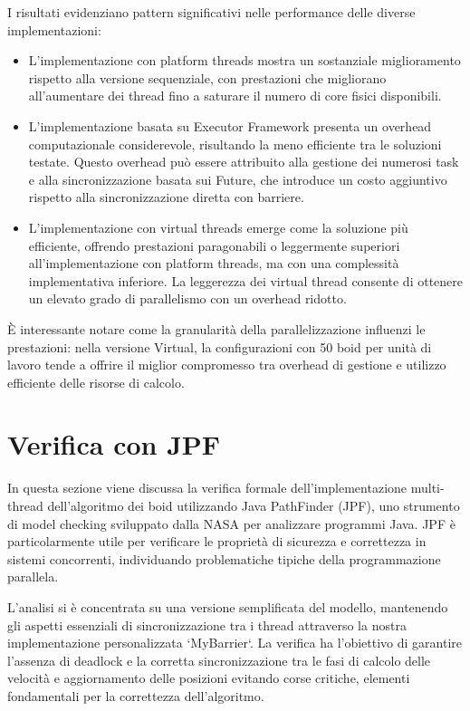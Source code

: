 \documentclass[a4paper,12pt]{report}
\begin{document}
I risultati evidenziano pattern significativi nelle performance delle diverse implementazioni:

\begin{itemize}
    \item L'implementazione con platform threads mostra un sostanziale miglioramento rispetto alla versione sequenziale, con prestazioni che migliorano all'aumentare dei thread fino a saturare il numero di core fisici disponibili.
    
    \item L'implementazione basata su Executor Framework presenta un overhead computazionale considerevole, risultando la meno efficiente tra le soluzioni testate. Questo overhead può essere attribuito alla gestione dei numerosi task e alla sincronizzazione basata sui Future, che introduce un costo aggiuntivo rispetto alla sincronizzazione diretta con barriere.
    
    \item L'implementazione con virtual threads emerge come la soluzione più efficiente, offrendo prestazioni paragonabili o leggermente superiori all'implementazione con platform threads, ma con una complessità implementativa inferiore. La leggerezza dei virtual thread consente di ottenere un elevato grado di parallelismo con un overhead ridotto.
\end{itemize}

È interessante notare come la granularità della parallelizzazione influenzi le prestazioni: nella versione Virtual, la configurazioni con 50 boid per unità di lavoro tende a offrire il miglior compromesso tra overhead di gestione e utilizzo efficiente delle risorse di calcolo.


\chapter{Verifica con JPF}
In questa sezione viene discussa la verifica formale dell'implementazione multi-thread dell'algoritmo dei boid utilizzando Java PathFinder (JPF), uno strumento di model checking sviluppato dalla NASA per analizzare programmi Java. 
JPF è particolarmente utile per verificare le proprietà di sicurezza e correttezza in sistemi concorrenti, individuando problematiche tipiche della programmazione parallela.

L'analisi si è concentrata su una versione semplificata del modello, mantenendo gli aspetti essenziali di sincronizzazione tra i thread attraverso la nostra implementazione personalizzata `MyBarrier`. La verifica ha l'obiettivo di garantire l'assenza di deadlock e la corretta sincronizzazione tra le fasi di calcolo delle velocità e aggiornamento delle posizioni evitando corse critiche, elementi fondamentali per la correttezza dell'algoritmo.
\end{document}
